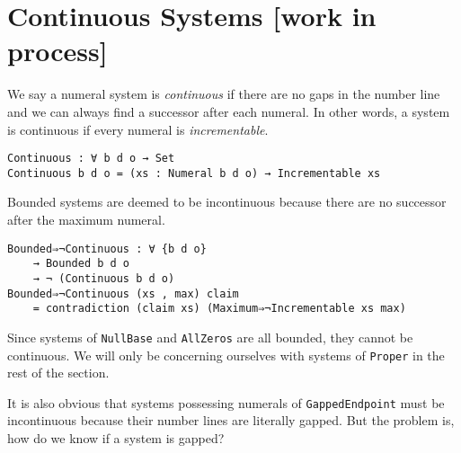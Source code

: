\documentclass[\main/thesis.tex]{subfiles}
\begin{document}
\section{Continuous Systems [work in process]}\label{continuous}

We say a numeral system is \textit{continuous} if there are no gaps in the number
line and we can always find a successor after each numeral.
In other words, a system is continuous if every numeral is \textit{incrementable}.

\begin{lstlisting}
Continuous : ∀ b d o → Set
Continuous b d o = (xs : Numeral b d o) → Incrementable xs
\end{lstlisting}

Bounded systems are deemed to be incontinuous because there are no successor
after the maximum numeral.

\begin{lstlisting}
Bounded⇒¬Continuous : ∀ {b d o}
    → Bounded b d o
    → ¬ (Continuous b d o)
Bounded⇒¬Continuous (xs , max) claim
    = contradiction (claim xs) (Maximum⇒¬Incrementable xs max)
\end{lstlisting}

Since systems of \lstinline|NullBase| and \lstinline|AllZeros| are all bounded,
they cannot be continuous. We will only be concerning ourselves with systems of
\lstinline|Proper| in the rest of the section.

It is also obvious that systems possessing numerals of \lstinline|GappedEndpoint|
must be incontinuous because their number lines are literally gapped.
But the problem is, how do we know if a system is gapped?
\end{document}
